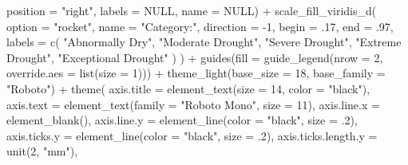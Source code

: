 \documentclass[
]{book}
\newenvironment{Shaded}{\begin{snugshade}}{\end{snugshade}}
\newcommand{\AttributeTok}[1]{\textcolor[rgb]{0.77,0.63,0.00}{#1}}
\newcommand{\ConstantTok}[1]{\textcolor[rgb]{0.00,0.00,0.00}{#1}}
\newcommand{\DecValTok}[1]{\textcolor[rgb]{0.00,0.00,0.81}{#1}}
\newcommand{\FunctionTok}[1]{\textcolor[rgb]{0.00,0.00,0.00}{#1}}
\newcommand{\NormalTok}[1]{#1}
\newcommand{\SpecialCharTok}[1]{\textcolor[rgb]{0.00,0.00,0.00}{#1}}
\newcommand{\StringTok}[1]{\textcolor[rgb]{0.31,0.60,0.02}{#1}}
\begin{document}
\begin{Shaded}
\begin{Highlighting}[]
                     \AttributeTok{position =} \StringTok{"right"}\NormalTok{, }
                     \AttributeTok{labels =} \ConstantTok{NULL}\NormalTok{, }
                     \AttributeTok{name =} \ConstantTok{NULL}\NormalTok{) }\SpecialCharTok{+}
  \FunctionTok{scale\_fill\_viridis\_d}\NormalTok{(}
    \AttributeTok{option =} \StringTok{"rocket"}\NormalTok{,}
    \AttributeTok{name =} \StringTok{"Category:"}\NormalTok{,}
    \AttributeTok{direction =} \SpecialCharTok{{-}}\DecValTok{1}\NormalTok{,}
    \AttributeTok{begin =}\NormalTok{ .}\DecValTok{17}\NormalTok{,}
    \AttributeTok{end =}\NormalTok{ .}\DecValTok{97}\NormalTok{,}
    \AttributeTok{labels =} \FunctionTok{c}\NormalTok{(}
      \StringTok{"Abnormally Dry"}\NormalTok{,}
      \StringTok{"Moderate Drought"}\NormalTok{,}
      \StringTok{"Severe Drought"}\NormalTok{,}
      \StringTok{"Extreme Drought"}\NormalTok{,}
      \StringTok{"Exceptional Drought"}
\NormalTok{    )}
\NormalTok{  ) }\SpecialCharTok{+}
  \FunctionTok{guides}\NormalTok{(}\AttributeTok{fill =} \FunctionTok{guide\_legend}\NormalTok{(}\AttributeTok{nrow =} \DecValTok{2}\NormalTok{,}
                             \AttributeTok{override.aes =} \FunctionTok{list}\NormalTok{(}\AttributeTok{size =} \DecValTok{1}\NormalTok{))) }\SpecialCharTok{+}
  \FunctionTok{theme\_light}\NormalTok{(}\AttributeTok{base\_size =} \DecValTok{18}\NormalTok{, }
              \AttributeTok{base\_family =} \StringTok{"Roboto"}\NormalTok{) }\SpecialCharTok{+}
  \FunctionTok{theme}\NormalTok{(}
    \AttributeTok{axis.title =} \FunctionTok{element\_text}\NormalTok{(}\AttributeTok{size =} \DecValTok{14}\NormalTok{, }
                              \AttributeTok{color =} \StringTok{"black"}\NormalTok{),}
    \AttributeTok{axis.text =} \FunctionTok{element\_text}\NormalTok{(}\AttributeTok{family =} \StringTok{"Roboto Mono"}\NormalTok{, }
                             \AttributeTok{size =} \DecValTok{11}\NormalTok{),}
    \AttributeTok{axis.line.x =} \FunctionTok{element\_blank}\NormalTok{(),}
    \AttributeTok{axis.line.y =} \FunctionTok{element\_line}\NormalTok{(}\AttributeTok{color =} \StringTok{"black"}\NormalTok{, }
                               \AttributeTok{size =}\NormalTok{ .}\DecValTok{2}\NormalTok{),}
    \AttributeTok{axis.ticks.y =} \FunctionTok{element\_line}\NormalTok{(}\AttributeTok{color =} \StringTok{"black"}\NormalTok{, }
                                \AttributeTok{size =}\NormalTok{ .}\DecValTok{2}\NormalTok{),}
    \AttributeTok{axis.ticks.length.y =} \FunctionTok{unit}\NormalTok{(}\DecValTok{2}\NormalTok{, }\StringTok{"mm"}\NormalTok{),}

\end{Highlighting}
\end{Shaded}
\end{document}
